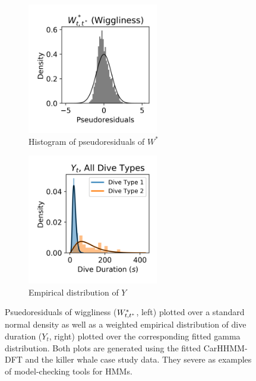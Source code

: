 \begin{figure}[ht]
    \begin{subfigure}{0.45\textwidth}
    	\centering
    	\includegraphics[width=2.25in]{../Plots/CarHHMM2_psedoresids_ahat.png}
    	\caption{Histogram of pseudoresiduals of $W^*$}
    	\label{fig:pseudoresids}
    \end{subfigure}
    \begin{subfigure}{0.45\textwidth}
    	\centering
    	\includegraphics[width=2.25in]{../Plots/CarHHMM2_empirical_hist_dive_duration.png}
    	\caption{Empirical distribution of $Y$}
    	\label{fig:empirical_dist}
    \end{subfigure}
    \caption{Psuedoresiduals of wiggliness ($W^*_{t,t^*}$, left) plotted over a standard normal density as well as a weighted empirical distribution of dive duration ($Y_t$, right) plotted over the corresponding fitted gamma distribution. Both plots are generated using the fitted CarHHMM-DFT and the killer whale case study data. They severe as examples of model-checking tools for HMMs.}
    \label{fig:model_checking}
\end{figure}


